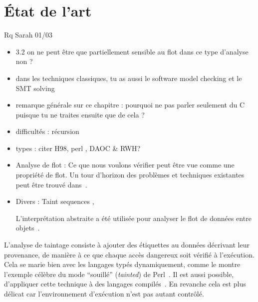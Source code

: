 \section{État de l'art}%

Rq Sarah 01/03

\begin{itemize}
\item
  3.2 on ne peut être que partiellement sensible au flot dans ce type
  d'analyse non ?
\item
  dans les techniques classiques, tu as aussi le software model checking
  et le SMT solving
\item
  remarque générale sur ce chapitre : pourquoi ne pas parler seulement
  du C puisque tu ne traites ensuite que de cela ?
\end{itemize}


\begin{itemize}
\item difficultés : récursion

\item
  types : citer H98\cite{haskell98}, perl \cite{perlCamelBook}, DAOC\cite{DAOC}
  \& RWH\cite{rwh}?
\item
  Analyse de flot :
Ce que nous voulons vérifier peut être vue comme une propriété de flot. Un tour
d'horizon des problèmes et techniques existantes peut être trouvé
dans~\cite{sm-jsac03}.

\item Divers : Taint sequences \cite{mdv10}, %

L'interprétation abstraite a été utilisée pour analyser le flot de données entre
objets~\cite{liang2012taint}.

\end{itemize}

L'analyse de taintage consiste à ajouter des étiquettes au données décrivant
leur provenance, de manière à ce que chaque accès dangereux soit vérifié à
l'exécution. Cela se marie bien avec les langages typés dynamiquement, comme le
montre l'exemple célèbre du mode ``souillé'' (\emph{tainted}) de
Perl~\cite{perlCamelBook}. Il est aussi possible, d'appliquer
cette technique à des langages compilés~\cite{clause-etal-issta07,oakland10}.
En revanche cela est plus délicat car l'environnement d'exécution n'est pas
autant contrôlé.


